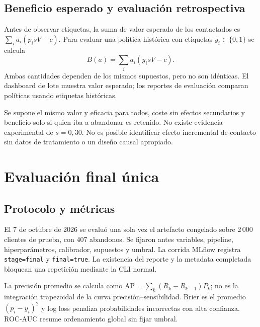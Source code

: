 \documentclass[11pt,a4paper,oneside]{report}
\begin{document}
\section{Beneficio esperado y evaluación retrospectiva}
Antes de observar etiquetas, la suma de valor esperado de los contactados es
$\sum_i a_i(p_i sV-c)$. Para evaluar una política histórica con etiquetas
$y_i\in\{0,1\}$ se calcula
\begin{equation}\label{eq:beneficio}
B(a)=\sum_i a_i(y_i sV-c).
\end{equation}
Ambas cantidades dependen de los mismos supuestos, pero no son idénticas.
El dashboard de lote muestra valor esperado; los reportes de evaluación
comparan políticas usando etiquetas históricas.

Se supone el mismo valor y eficacia para todos, coste sin efectos secundarios
y beneficio solo si quien iba a abandonar es retenido. No existe evidencia
experimental de $s=0{,}30$. No es posible identificar efecto incremental de
contacto sin datos de tratamiento o un diseño causal apropiado.

\chapter{Evaluación final única}
\section{Protocolo y métricas}
El 7 de octubre de 2026 se evaluó una sola vez el artefacto congelado sobre
2\,000 clientes de prueba, con 407 abandonos. Se fijaron antes variables,
pipeline, hiperparámetros, calibrador, supuestos y umbral. La corrida MLflow
registra \texttt{stage=final} y \texttt{final=true}. La existencia del reporte
y la metadata completada bloquean una repetición mediante la CLI normal.

La precisión promedio se calcula como $\mathrm{AP}=\sum_k(R_k-R_{k-1})P_k$;
no es la integración trapezoidal de la curva precisión--sensibilidad. Brier
es el promedio $(p_i-y_i)^2$ y log loss penaliza probabilidades incorrectas
con alta confianza. ROC-AUC resume ordenamiento global sin fijar umbral.
\end{document}
